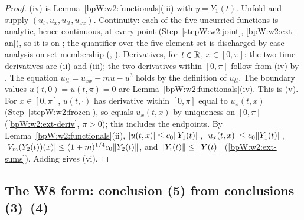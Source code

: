 \begin{proof}
(iv) is Lemma~\ref{bpW:w2:functionals}(iii) with $y=Y_1(t)$.
\label{stepW:w2:frozen}
Unfold  and supply $(u_t,u_x,u_{tt},u_{xx})$. Continuity: each of the five uncurried
functions is analytic, hence continuous, at every point (Step~\ref{stepW:w2:joint}, \ref{bpW:w2:ext-an}), so it is
 on ; the quantifier over the five-element set is
discharged by case analysis on set membership (, ).
Derivatives, for $t\in\mathbb{R}$, $x\in[0,\pi]$: the two time derivatives are (ii) and (iii); the two derivatives within
$[0,\pi]$ follow from (iv) by . The equation
$u_{tt}=u_{xx}-mu-u^3$ holds by the definition of $u_{tt}$. The boundary values $u(t,0)=u(t,\pi)=0$ are
Lemma~\ref{bpW:w2:functionals}(iv). This is (v).
\label{stepW:w2:bound}
For $x\in[0,\pi]$, $u(t,\cdot)$ has derivative within $[0,\pi]$ equal to $u_x(t,x)$ (Step~\ref{stepW:w2:frozen}), so
 equals $u_x(t,x)$ by uniqueness on $[0,\pi]$ (\ref{bpW:w2:ext-deriv}, $\pi>0$); this includes the
endpoints. By Lemma~\ref{bpW:w2:functionals}(ii), $\lvert u(t,x)\rvert\le c_0\lVert Y_1(t)\rVert$,
$\lvert u_x(t,x)\rvert\le c_0\lVert Y_1(t)\rVert$, $\lvert V_m(Y_2(t))(x)\rvert\le(1+m)^{1/4}c_0\lVert Y_2(t)\rVert$, and
$\lVert Y_i(t)\rVert\le\lVert Y(t)\rVert$ (\ref{bpW:w2:ext-sums}). Adding gives (vi).
\end{proof}

\subsection{The W8 form: conclusion (5) from conclusions (3)--(4)}\label{bpW:w2:main-sec}

